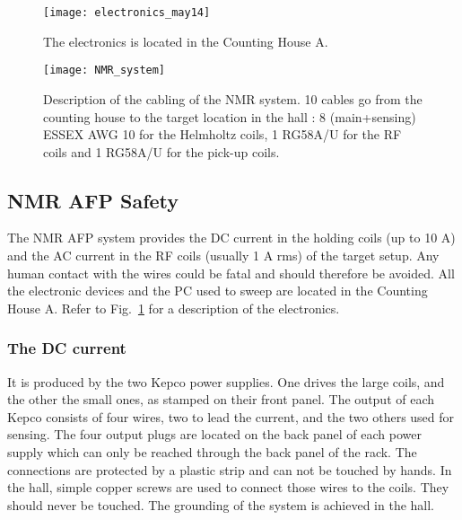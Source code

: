 {\begin{figure}
\begin{center}
\centerline{\texttt{[image: electronics\_may14]}}
\caption{The electronics is located in
the Counting House A.}
\end{center}
\label{fig2:electronics_new}
\end{figure}

\begin{figure}
\begin{center}
\centerline{\texttt{[image: NMR\_system]}}
\caption[Cabling of the NMR system]%
{Description of the cabling of the NMR system.
10 cables go from the counting house to the target location
in the hall : 8 (main+sensing) ESSEX AWG 10 for
the Helmholtz coils, 1 RG58A/U for the RF coils and 1 RG58A/U for the
pick-up coils.}
\end{center}
\label{fig3:cabling}
\end{figure}

\begin{safetyen}{10}{5}
\subsection{NMR AFP Safety }

The NMR AFP system provides the DC current in the holding coils (up to
10 A) and the AC current in the RF 
coils (usually 1 A rms) of the target setup. Any human contact with the
wires could be fatal and should 
therefore be avoided. All the electronic devices and the PC used
to sweep are located in the Counting House A.
Refer to Fig.~\ref{fig2:electronics_new} for a description of the
electronics.

\subsubsection{ The DC current}

It is produced by the two Kepco power supplies. 
One drives the large coils, and the other the small ones, as stamped 
on their front panel. The output of each Kepco consists of four wires,
two to lead the current, 
and the two others used for sensing. The four output plugs are located
on the back panel of each power 
supply which can only be reached through the back
panel of the rack. The connections are protected by a plastic strip and
can not be touched by hands. 
In the hall, simple copper screws are used to connect those wires to the
coils. They should never be 
touched. The grounding of the system is achieved in the hall.  


\end{safetyen}}
